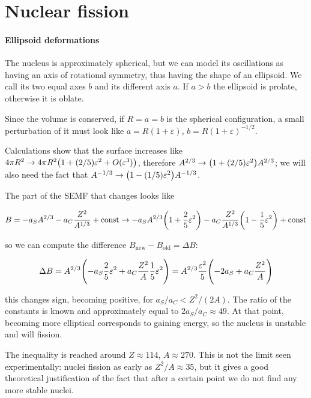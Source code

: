 \documentclass[main.tex]{subfiles}
\begin{document}
\section{Nuclear fission}

\paragraph{Ellipsoid deformations}

The nucleus is approximately spherical, but we can model its oscillations as having an axis of rotational symmetry, thus having the shape of an ellipsoid. We call its two equal axes \(b\) and its different axis \(a\). If \(a>b\) the ellipsoid is prolate, otherwise it is oblate.

Since the volume is conserved, if \(R=a=b\) is the spherical configuration, a small perturbation of it must look like \(a = R(1+ \varepsilon )\), \(b = R(1+\varepsilon)^{-1/2}\).

Calculations show that the surface increases like \( 4 \pi R^2 \rightarrow 4 \pi R^2 \qty(1  + (2/5) \varepsilon^2 + O(\varepsilon^3))\), therefore \(A^{2/3} \rightarrow \qty(1+ (2/5)\varepsilon^2) A^{2/3}\); we will also need the fact that \(A^{-1/3} \rightarrow \qty(1-(1/5)\varepsilon^2) A^{-1/3}\).

The part of the SEMF that changes looks like

\begin{equation}
    B = - a_S A^{2/3} - a_C \frac{Z^2}{A^{1/3}} +  \text{const}
    \rightarrow - a_S A^{2/3} \qty(1+ \frac 25 \varepsilon^2)  - a_C \frac{Z^2}{A^{1/3}} \qty(1-\frac 15 \varepsilon^2)+  \text{const}
\end{equation}

so we can compute the difference \(B_ \text{new} - B _ \text{old} = \Delta B\):

\begin{equation}
    \Delta B
    = A^{2/3} \qty( - a_S  \frac 25 \varepsilon^2 + a_C \frac{Z^2}{A} \frac 15 \varepsilon^2)
    = A^{2/3} \frac{\varepsilon^2}{5} \qty(-2a_S + a_C \frac{Z^2}{A})
\end{equation}

this changes sign, becoming positive, for \(a_S / a_C < Z^2 / (2A)\). The ratio of the constants is known and approximately equal to \(2a_S /a_C \approx 49\). At that point, becoming more elliptical corresponds to gaining energy, so the nucleus is unstable and will fission.

The inequality is reached around \(Z \approx 114\), \(A \approx 270\). This is not the limit seen experimentally: nuclei fission as early as \(Z^2 / A \approx 35\), but it gives a good theoretical justification of the fact that after a certain point we do not find any more stable nuclei.
\end{document}
